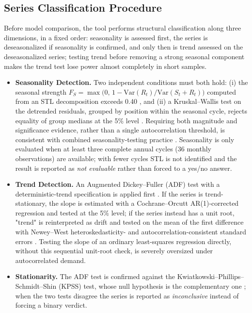 \documentclass[forecasting,article,submit,pdftex,moreauthors]{Definitions/mdpi}
\begin{document}
\subsection{Series Classification Procedure}
\label{sec:classification}

Before model comparison, the tool performs structural classification along three dimensions, in a fixed order: seasonality is assessed first, the series is deseasonalized if seasonality is confirmed, and only then is trend assessed on the deseasonalized series; testing trend before removing a strong seasonal component makes the trend test lose power almost completely in short samples.

\begin{itemize}
\item \textbf{Seasonality Detection.} Two independent conditions must both hold: (i) the seasonal strength $F_S = \max\!\big(0,\, 1 - \mathrm{Var}(R_t)/\mathrm{Var}(S_t+R_t)\big)$ computed from an STL decomposition exceeds 0.40 \cite{wang2006}, and (ii) a Kruskal--Wallis test on the detrended residuals, grouped by position within the seasonal cycle, rejects equality of group medians at the 5\% level \cite{kruskal1952}. Requiring both magnitude and significance evidence, rather than a single autocorrelation threshold, is consistent with combined seasonality-testing practice \cite{ollechwebel2020}. Seasonality is only evaluated when at least three complete annual cycles (36 monthly observations) are available; with fewer cycles STL is not identified and the result is reported as \emph{not evaluable} rather than forced to a yes/no answer.
\item \textbf{Trend Detection.} An Augmented Dickey--Fuller (ADF) test with a deterministic-trend specification is applied first \cite{dickeyfuller1979}. If the series is trend-stationary, the slope is estimated with a Cochrane--Orcutt AR(1)-corrected regression \cite{cochraneorcutt1949} and tested at the 5\% level; if the series instead has a unit root, "trend" is reinterpreted as drift and tested on the mean of the first difference with Newey--West heteroskedasticity- and autocorrelation-consistent standard errors \cite{neweywest1987}. Testing the slope of an ordinary least-squares regression directly, without this sequential unit-root check, is severely oversized under autocorrelated demand.
\item \textbf{Stationarity.} The ADF test is confirmed against the Kwiatkowski--Phillips--Schmidt--Shin (KPSS) test, whose null hypothesis is the complementary one \cite{kpss1992}; when the two tests disagree the series is reported as \emph{inconclusive} instead of forcing a binary verdict.
\end{itemize}
\end{document}
